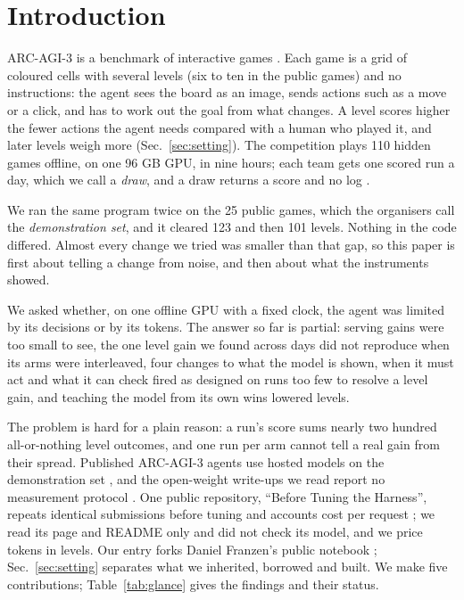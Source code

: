 \section{Introduction}\label{sec:intro}

ARC-AGI-3 is a benchmark of interactive games \citep{arcprize2026arcagi3}.
Each game is a grid of coloured cells with several levels (six to ten in the public games) and no instructions: the agent sees the board as an image, sends actions such as a move or a click, and has to work out the goal from what changes.
A level scores higher the fewer actions the agent needs compared with a human who played it, and later levels weigh more (Sec.~\ref{sec:setting}).
The competition plays 110 hidden games offline, on one 96 GB GPU, in nine hours; each team gets one scored run a day, which we call a \emph{draw}, and a draw returns a score and no log \citep{arcprize2026competitions}. %

We ran the same program twice on the 25 public games, which the organisers call the \emph{demonstration set}, and it cleared 123 and then 101 levels. %
Nothing in the code differed.
Almost every change we tried was smaller than that gap, so this paper is first about telling a change from noise, and then about what the instruments showed.

We asked whether, on one offline GPU with a fixed clock, the agent was limited by its decisions or by its tokens.
The answer so far is partial: serving gains were too small to see, the one level gain we found across days did not reproduce when its arms were interleaved, four changes to what the model is shown, when it must act and what it can check fired as designed on runs too few to resolve a level gain, and teaching the model from its own wins lowered levels.

The problem is hard for a plain reason: a run's score sums nearly two hundred all-or-nothing level outcomes, and one run per arm cannot tell a real gain from their spread.
Published ARC-AGI-3 agents use hosted models on the demonstration set \citep{lehmann2026tycho,skoutnev2026twin}, and the open-weight write-ups we read report no measurement protocol \citep{bessis2026duck,franzen2026writeup}.
One public repository, ``Before Tuning the Harness'', repeats identical submissions before tuning and accounts cost per request \citep{guoyi2026repeat}; we read its page and README only and did not check its model, and we price tokens in levels. %
Our entry forks Daniel Franzen's public notebook \citep{franzen2026milestone2}; Sec.~\ref{sec:setting} separates what we inherited, borrowed and built.
We make five contributions; Table~\ref{tab:glance} gives the findings and their status.


